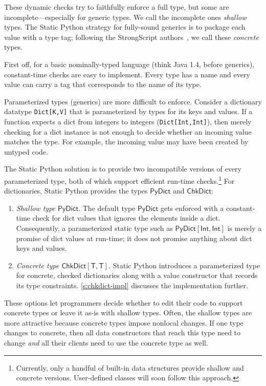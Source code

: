 \documentclass[english,cleveref,submission]{programming}
\newcommand{\SP}{Static Python}
\newcommand{\code}[1]{\texttt{#1}}
\newcommand{\typefont}[1]{\mathsf{#1}}
\newcommand{\paramtype}[2]{#1[#2]}
\newcommand{\sptype}{\typefont{T}}
\newcommand{\sptint}{\typefont{Int}}
\newcommand{\sptrawpydict}{\typefont{PyDict}}
\newcommand{\sptrawchkdict}{\typefont{ChkDict}} %
\newcommand{\sptpydict}[2]{\paramtype{\sptrawpydict}{#1, #2}}
\newcommand{\sptchkdict}[2]{\paramtype{\typefont{ChkDict}}{#1, #2}}
\begin{document}
These dynamic checks try to faithfully enforce a full type, but some are incomplete---especially
for generic types.
We call the incomplete ones \emph{shallow} types.
The \SP{} strategy for fully-sound generics is to package each value with a type
tag; following the \textsf{StrongScript} authors~\cite{rzv-ecoop-2015}, we call
these \emph{concrete} types.

First off, for a basic nominally-typed language (think Java 1.4, before
generics), constant-time checks are easy to implement.
Every type has a name and every value can carry a tag that corresponds to the
name of its type.

Parameterized types (generics) are more difficult to enforce.
Consider a dictionary datatype \code{Dict[K,V]} that is parameterized by types
for its keys and values.
If a function expects a dict from integers to integers (\code{Dict[Int,Int]}),
then merely checking for a dict instance is not enough to decide whether an
incoming value matches the type.
For example, the incoming value may have been created by untyped code.

The \SP{} solution is to provide two incompatible versions of every parameterized type,
both of which support efficient run-time checks.\footnote{Currently, only a handful of built-in data structures provide shallow
and concrete versions. User-defined classes will soon follow this approach.}
For dictionaries, \SP{} provides the types $\sptrawpydict$ and $\sptrawchkdict$:
\begin{enumerate}
  \item
    \emph{Shallow type $\sptrawpydict$}.
    The default type $\sptrawpydict$ gets enforced with a constant-time check
    for dict values that ignores the elements inside a dict.
    Consequently, a parameterized static type such as $\sptpydict{\sptint}{\sptint}$
    is merely a promise of dict values at run-time; it does not promise anything about
    dict keys and values.
  \item
    \emph{Concrete type $\sptchkdict{\sptype}{\sptype}$}.
    \SP{} introduces a parameterized type for concrete, checked dictionaries
    along with a value constructor that records its type constraints.
    \cref{s:chkdict-impl} discusses the implementation further.
\end{enumerate}
%
These options let programmers decide whether to edit their code to support concrete types
or leave it as-is with shallow types.
Often, the shallow types are more attractive because concrete types impose
nonlocal changes.
If one type changes to concrete, then all data constructors that reach this type need
to change \emph{and} all their clients need to use the concrete type as well.
\end{document}

